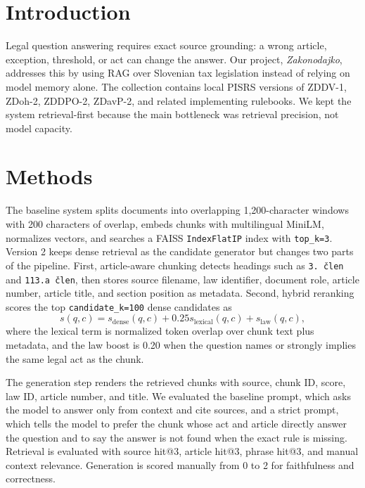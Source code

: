 \documentclass[fleqn,moreauthors,10pt]{ds_report}
\affiliation{\textit{Advisor: Slavko \v{Z}itnik}}
\newcommand{\code}[1]{\texttt{#1}}
\begin{document}
\flushbottom
\maketitle
\thispagestyle{empty}

\section*{Introduction}

Legal question answering requires exact source grounding: a wrong article, exception, threshold, or act can change the answer. Our project, \textit{Zakonodajko}, addresses this by using RAG over Slovenian tax legislation instead of relying on model memory alone. The collection contains local PISRS versions of ZDDV-1, ZDoh-2, ZDDPO-2, ZDavP-2, and related implementing rulebooks. We kept the system retrieval-first because the main bottleneck was retrieval precision, not model capacity.

\section*{Methods}

The baseline system splits documents into overlapping 1,200-character windows with 200 characters of overlap, embeds chunks with multilingual MiniLM, normalizes vectors, and searches a FAISS \code{IndexFlatIP} index with \code{top\_k=3}. Version 2 keeps dense retrieval as the candidate generator but changes two parts of the pipeline. First, article-aware chunking detects headings such as \code{3. \v{c}len} and \code{113.a \v{c}len}, then stores source filename, law identifier, document role, article number, article title, and section position as metadata. Second, hybrid reranking scores the top \code{candidate\_k=100} dense candidates as
\[
s(q,c)=s_{\mathrm{dense}}(q,c)+0.25s_{\mathrm{lexical}}(q,c)+s_{\mathrm{law}}(q,c),
\]
where the lexical term is normalized token overlap over chunk text plus metadata, and the law boost is 0.20 when the question names or strongly implies the same legal act as the chunk.

The generation step renders the retrieved chunks with source, chunk ID, score, law ID, article number, and title. We evaluated the baseline prompt, which asks the model to answer only from context and cite sources, and a strict prompt, which tells the model to prefer the chunk whose act and article directly answer the question and to say the answer is not found when the exact rule is missing. Retrieval is evaluated with source hit@3, article hit@3, phrase hit@3, and manual context relevance. Generation is scored manually from 0 to 2 for faithfulness and correctness.
\end{document}
